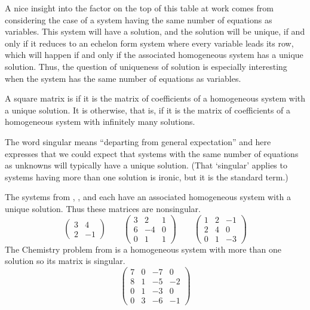 A nice insight into the factor on the top of this table at
work comes from considering the case of
a system having the same number of equations as variables. 
This system will have a solution, and the solution will be unique, if and only
if it reduces to an echelon form system where every variable leads its row,
which will happen if and only if
the associated homogeneous system has a unique solution.
Thus, the question of uniqueness of solution is especially
interesting when the system has the same number of
equations as variables.

\begin{definition}
A square matrix is 
if it is the matrix of coefficients of a
homogeneous system with a unique solution.
It is
 otherwise,
that is,
if it is the matrix of coefficients of a homogeneous system with 
infinitely many solutions.
\end{definition}

The word singular means ``departing from general expectation''
and here expresses that we could expect that systems with the same number
of equations as unknowns will typically have a unique solution.
(That `singular' applies to systems having more than one solution 
is ironic, but it is the standard term.)

\begin{example}
The systems from ,
,
and 
each have an associated homogeneous system with a unique solution.
Thus these matrices are nonsingular.
\begin{equation*}
  \begin{pmatrix}
    3  &4  \\
    2  &-1
  \end{pmatrix}
  \qquad
  \begin{pmatrix}
    3  &2   &1  \\
    6  &-4  &0  \\
    0  &1   &1
  \end{pmatrix}
  \qquad
  \begin{pmatrix}
    1  &2  &-1 \\
    2  &4  &0  \\
    0  &1  &-3
  \end{pmatrix}
\end{equation*}
The Chemistry problem from  
is a homogeneous system with more than one solution so its matrix
is singular. 
\begin{equation*}
  \begin{pmatrix}
    7  &0  &-7 &0  \\
    8  &1  &-5 &-2 \\
    0  &1  &-3 &0  \\
    0  &3  &-6 &-1
  \end{pmatrix}
\end{equation*}
\end{example}

